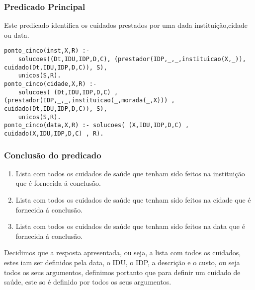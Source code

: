 \documentclass[a4paper]{report} %
\begin{document}
\subsubsection{Predicado Principal}
Este predicado identifica os cuidados prestados por uma dada instituição,cidade ou data.

\begin{verbatim}
ponto_cinco(inst,X,R) :- 
    solucoes((Dt,IDU,IDP,D,C), (prestador(IDP,_,_,instituicao(X,_)), cuidado(Dt,IDU,IDP,D,C)), S),
    unicos(S,R).
ponto_cinco(cidade,X,R) :- 
    solucoes( (Dt,IDU,IDP,D,C) , (prestador(IDP,_,_,instituicao(_,morada(_,X))) , cuidado(Dt,IDU,IDP,D,C)), S), 
    unicos(S,R).
ponto_cinco(data,X,R) :- solucoes( (X,IDU,IDP,D,C) , cuidado(X,IDU,IDP,D,C) , R).
\end{verbatim}

\subsubsection{Conclusão do predicado} 
\begin{enumerate}
\item Lista com todos os cuidados de saúde que tenham sido feitos na instituição que é fornecida á conclusão.
\item Lista com todos os cuidados de saúde que tenham sido feitos na cidade que é fornecida á conclusão.
\item Lista com todos os cuidados de saúde que tenham sido feitos na data que é fornecida á conclusão.
\end{enumerate}

Decidimos que a resposta apresentada, ou seja, a lista com todos os cuidados, estes iam ser definidos pela data, o IDU, o IDP, a descrição e o custo, ou seja todos os seus argumentos, definimos portanto que para definir um cuidado de saúde, este so é definido por todos os seus argumentos.
\end{document}
